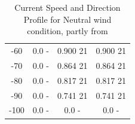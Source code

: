 \begin{table} [H]
\begin{tabular}{ |c|c|c|c|}
  -60 & 0.0 \hspace{0.7cm} - & 0.900 \hspace{0.7cm} 21  & 0.900 \hspace{0.7cm} 21 \\
 -70 & 0.0 \hspace{0.7cm} - & 0.864 \hspace{0.7cm} 21  & 0.864 \hspace{0.7cm} 21 \\
  -80 & 0.0 \hspace{0.7cm} - & 0.817 \hspace{0.7cm} 21  & 0.817 \hspace{0.7cm} 21 \\
 -90 & 0.0 \hspace{0.7cm} - & 0.741 \hspace{0.7cm} 21  & 0.741 \hspace{0.7cm} 21 \\ 
 -100 & 0.0 \hspace{0.7cm} - & 0.0 \hspace{0.7cm} -  & 0.0 \hspace{0.7cm} - \\ 
 \hline
\end{tabular}
\caption{Current Speed and Direction Profile for Neutral wind condition, partly from \cite{Lifes50+D1.1}}
\label{table:tidcurneu}
\end{table}   

